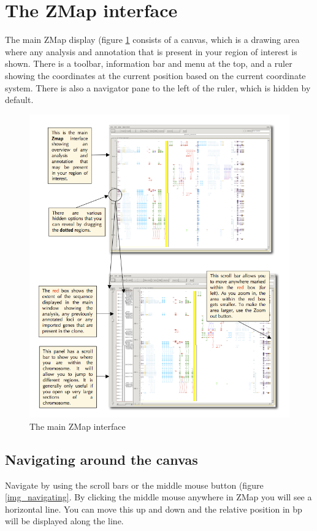 \documentclass[letterpaper]{article}
\begin{document}
\clearpage
\section{The ZMap interface}

The main ZMap display (figure \ref{img_main_interface} consists of a canvas, which is a drawing area where any analysis and annotation that is present in your region of interest is shown. There is a toolbar, information bar and menu at the top, and a ruler showing the coordinates at the current position based on the current coordinate system. There is also a navigator pane to the left of the ruler, which is hidden by default.

\begin{figure}
\centering
\color[rgb]{0.30980393,0.5058824,0.7411765}
\includegraphics[width=15.231cm]{img_main_interface.png}
\caption{The main ZMap interface}
\label{img_main_interface}
\end{figure}


\subsection{Navigating around the canvas}
Navigate by using the scroll bars or the middle mouse button (figure \ref{img_navigating}. By clicking the middle mouse anywhere in ZMap you will see a horizontal line. You can move this up and down and the relative position in bp will be displayed along the line.
\end{document}

